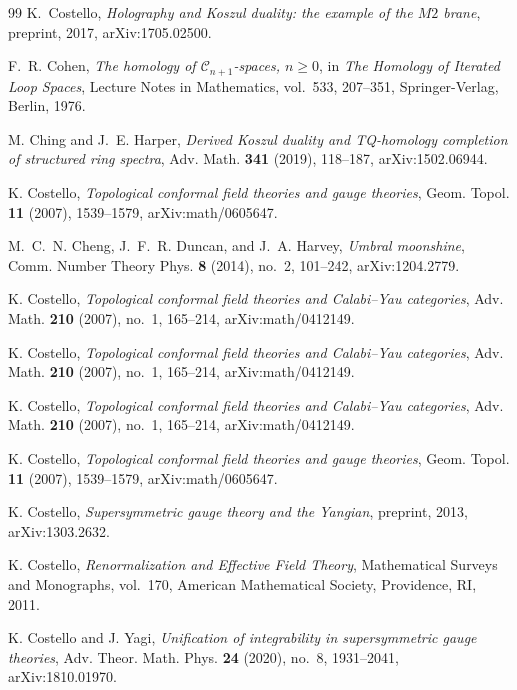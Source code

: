 \begin{thebibliography}{99}
K.~Costello, \emph{Holography and Koszul duality: the example of the $M2$ brane}, preprint, 2017, arXiv:1705.02500.

F.~R. Cohen, \emph{The homology of $\mathcal{C}_{n+1}$-spaces, $n \geq 0$}, in \emph{The Homology of Iterated Loop Spaces}, Lecture Notes in Mathematics, vol.~533, 207--351, Springer-Verlag, Berlin, 1976.

M. Ching and J.~E. Harper, \emph{Derived Koszul duality and TQ-homology completion of structured ring spectra}, Adv. Math. \textbf{341} (2019), 118--187, arXiv:1502.06944.

K. Costello, \emph{Topological conformal field theories and gauge theories}, Geom. Topol. \textbf{11} (2007), 1539--1579, arXiv:math/0605647.


M.~C.~N. Cheng, J.~F.~R. Duncan, and J.~A. Harvey, \emph{Umbral moonshine}, Comm. Number Theory Phys. \textbf{8} (2014), no.~2, 101--242, arXiv:1204.2779.

K. Costello, \emph{Topological conformal field theories and Calabi--Yau categories}, Adv. Math. \textbf{210} (2007), no.~1, 165--214, arXiv:math/0412149.

K. Costello, \emph{Topological conformal field theories and Calabi--Yau categories}, Adv. Math. \textbf{210} (2007), no.~1, 165--214, arXiv:math/0412149.


K. Costello, \emph{Topological conformal field theories and Calabi--Yau categories}, Adv. Math. \textbf{210} (2007), no.~1, 165--214, arXiv:math/0412149.


K. Costello, \emph{Topological conformal field theories and gauge theories}, Geom. Topol. \textbf{11} (2007), 1539--1579, arXiv:math/0605647.

K. Costello, \emph{Supersymmetric gauge theory and the Yangian}, preprint, 2013, arXiv:1303.2632.

K. Costello, \emph{Renormalization and Effective Field Theory}, Mathematical Surveys and Monographs, vol.~170, American Mathematical Society, Providence, RI, 2011.

K. Costello and J. Yagi, \emph{Unification of integrability in supersymmetric gauge theories}, Adv. Theor. Math. Phys. \textbf{24} (2020), no.~8, 1931--2041, arXiv:1810.01970.


\end{thebibliography}
